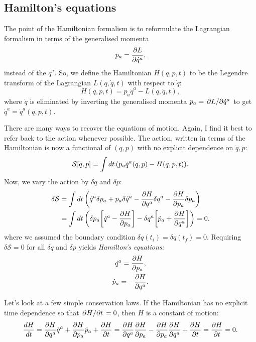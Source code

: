 \documentclass{article}
\begin{document}
\subsection{Hamilton's equations}
The point of the Hamiltonian formalism is to reformulate the Lagrangian formalism in terms of the generalised momenta
\[
	p_{a} = \pdv{L}{\dot{q}^{a}},
\]
instead of the $ \dot{q}^{a} $. So, we define the Hamiltonian $ H(q,p,t) $ to be the Legendre transform of the Lagrangian $ L(q,\dot{q}, t) $ with respect to $ \dot{q} $:
\begin{equation}
	H(q,p,t) = p_{a} \dot{q}^{a} - L(q,\dot{q},t),
\end{equation}
where $ \dot{q} $ is eliminated by inverting the generalised momenta $ p_{a} = \pdv*{L}{\dot{q}^{a}}$ to get $ \dot{q}^{a} = \dot{q}^{a}(q,p,t) $. 
\par
There are many ways to recover the equations of motion. Again, I find it best to refer back to the action whenever possible. The action, written in terms of the Hamiltonian is now a functional of $ (q,p) $ with no explicit dependence on $ \dot{q}, \dot{p} $:
\begin{equation}
	\mathcal{S}[q,p] = \int \dd{t} \qty(p_{a} \dot{q}^{a}(q,p) - H(q,p,t)).
\end{equation}
Now, we vary the action by $ \delta q $ and $ \delta p $:
\begin{align}
	\begin{split}
		\delta \mathcal{S} &= \int \dd{t} \qty( \dot{q}^{a}\delta p_{a} + p_{a} \delta \dot{q}^{a} - \pdv{H}{q^{a}} \delta q^{a} - \pdv{H}{p_{a}} \delta p_{a}) \\
		&= \int \dd{t} \qty( \delta p_{a} \qty[\dot{q}^{a} - \pdv{H}{p_{a}}] - \delta q^{a} \qty[\dot{p}_{a} + \pdv{H}{q^{a}}] ) = 0.
	\end{split}
\end{align}
where we assumed the boundary condition $ \delta q(t_{i}) = \delta q(t_{f}) = 0 $. Requiring $ \delta \mathcal{S} = 0 $ for all $ \delta q $ and $ \delta p $ yields \textit{Hamilton's equations:}
\begin{gather}
	\dot{q}^{a} = \pdv{H}{p_{a}}, \\
	\dot{p}_{a} = -\pdv{H}{q^{a}}.
\end{gather}
\par
Let's look at a few simple conservation laws. If the Hamiltonian has no explicit time dependence so that $ \pdv*{H}{t} = 0 $, then $ H $ is a constant of motion:
\begin{equation}
	\dv{H}{t} = \pdv{H}{q^{a}} \dot{q}^{a} + \pdv{H}{p_{a}} \dot{p}_{a} + \pdv{H}{t} = \pdv{H}{q^{a}} \pdv{H}{p_{a}} - \pdv{H}{p_{a}} \pdv{H}{q^{a}} + \pdv{H}{t} = \pdv{H}{t} = 0.
\end{equation}
\end{document}
